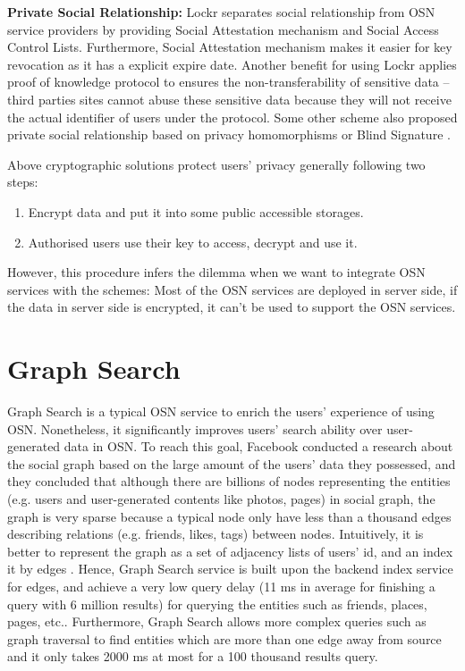 {\bf Private Social Relationship: } Lockr \cite{tootoonchian2009lockr} separates social relationship from OSN service providers by providing Social Attestation mechanism and Social Access Control Lists. Furthermore, Social Attestation mechanism makes it easier for key revocation as it has a explicit expire date. Another benefit for using Lockr applies proof of knowledge protocol to ensures the non-transferability of sensitive data -- third parties sites cannot abuse these sensitive data because they will not receive the actual identifier of users under the protocol. Some other scheme also proposed private social relationship based on privacy homomorphisms \cite{domingo2008privacy} or Blind Signature \cite{de2012hummingbird}.
 
Above cryptographic solutions protect users' privacy generally following two steps:
\begin{enumerate}
\setlength{\itemsep}{0pt}
\item Encrypt data and put it into some public accessible storages.
\item Authorised users use their key to access, decrypt and use it.
\end{enumerate}
However, this procedure infers the dilemma when we want to integrate OSN services with the schemes: Most of the OSN services are deployed in server side, if the data in server side is encrypted, it can't be used to support the OSN services.

\section{Graph Search}
Graph Search \cite{facebook2013graph} is a typical OSN service to enrich the users' experience of using OSN. Nonetheless, it significantly improves users' search ability over user-generated data in OSN. To reach this goal, Facebook conducted a research about the social graph based on the large amount of the users' data they possessed, and they concluded that although there are billions of nodes representing the entities (e.g. users and user-generated contents like photos, pages) in social graph, the graph is very sparse because a typical node only have less than a thousand edges describing relations (e.g. friends, likes, tags) between nodes. Intuitively, it is better to represent the graph as a set of adjacency lists of users' id, and an index it by edges \cite{curtiss2013unicorn}. Hence, Graph Search service is built upon the backend index service for edges, and achieve a very low query delay (11 ms in average for finishing a query with 6 million results) for querying the entities such as friends, places, pages, etc.. Furthermore, Graph Search allows more complex queries such as graph traversal to find entities which are more than one edge away from source and it only takes 2000 ms at most for a 100 thousand results query. 

